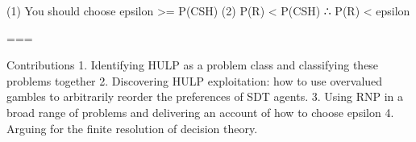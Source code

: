 (1) You should choose epsilon >= P(CSH)
(2) P(R) < P(CSH)
 ∴  P(R) < epsilon

===



Contributions
1. Identifying HULP as a problem class and classifying these problems together
2. Discovering HULP exploitation: how to use overvalued gambles to arbitrarily reorder the preferences of SDT agents.
3. Using RNP in a broad range of problems and delivering an account of how to choose epsilon 
4. Arguing for the finite resolution of decision theory.